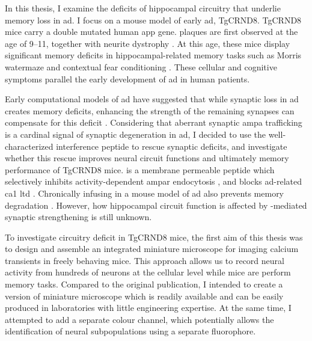 In this thesis, I examine the deficits of hippocampal circuitry that underlie memory loss in \gls{ad}. I focus on a mouse model of early \gls{ad}, TgCRND8. TgCRND8 mice carry a double mutated human \gls{app} gene. \abeta{} plaques are first observed at the age of \SIrange{9}{11}{\week}, together with neurite dystrophy \citep{chishti01}. At this age, these mice display significant memory deficits in hippocampal-related memory tasks such as Morris watermaze and contextual fear conditioning \citep{hyde05, yiu11}. These cellular and cognitive symptoms parallel the early development of \gls{ad} in human patients. 

Early computational models of \gls{ad} have suggested that while synaptic loss in \gls{ad} creates memory deficits, enhancing the strength of the remaining synapses can compensate for this deficit \citep{horn93}. Considering that aberrant synaptic \gls{ampa} trafficking is a cardinal signal of synaptic degeneration in \gls{ad}, I decided to use the well-characterized interference peptide \tglu to rescue synaptic deficits, and investigate whether this rescue improves neural circuit functions and ultimately memory performance of TgCRND8 mice. \tglu is a membrane permeable peptide which selectively inhibits activity-dependent \gls{ampar} endocytosis \citep{ahmadian04}, and blocks \gls{ad}-related \gls{ca1} \gls{ltd} \citep{dong15}. Chronically infusing \tglu in a mouse model of \gls{ad} also prevents memory degradation \citep{dong15}. However, how hippocampal circuit function is affected by \tglu-mediated synaptic strengthening is still unknown. 

To investigate circuitry deficit in TgCRND8 mice, the first aim of this thesis was to design and assemble an integrated miniature microscope for imaging calcium transients in freely behaving mice. This approach allows us to record neural activity from hundreds of neurons at the cellular level while mice are perform memory tasks. Compared to the original \citet{ghosh11} publication, I intended to create a version of miniature microscope which is readily available and can be easily produced in laboratories with little engineering expertise. At the same time, I attempted to add a separate colour channel, which potentially allows the identification of neural subpopulations using a separate fluorophore. 

